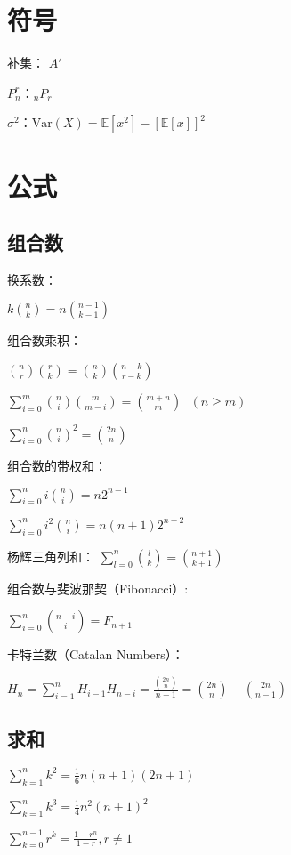 \documentclass[9pt,landscape]{article}
\begin{document}
\begin{multicols}{3}

\columnseprule=0.25pt

\section{符号}

补集： $A'$

$P_n^r$：$_nP_r$

$\sigma^2$：$\text{Var}(X)=\mathbb{E}[x^2]-\left[\mathbb{E}[x]\right]^2$

\section{公式}

\subsection{组合数}

换系数：

$k \binom{n}{k} = n \binom{n-1}{k-1}$

组合数乘积：

$\binom{n}{r}\binom{r}{k} = \binom{n}{k}\binom{n-k}{r-k}$

$\sum_{i=0}^m \binom{n}{i}\binom{m}{m-i} = \binom{m+n}{m}\ \ \ (n \geq m)$

$\sum_{i=0}^n\binom{n}{i}^2=\binom{2n}{n}$

组合数的带权和：

$ \sum_{i=0}^ni\binom{n}{i}=n2^{n-1}$

$ \sum_{i=0}^ni^2\binom{n}{i}=n(n+1)2^{n-2}$

杨辉三角列和：
$ \sum_{l=0}^n\binom{l}{k} = \binom{n+1}{k+1}$

组合数与斐波那契（Fibonacci）:

$ \sum_{i=0}^n\binom{n-i}{i}=F_{n+1}$

卡特兰数（Catalan Numbers）：

$H_n=\sum_{i=1}^nH_{i-1}H_{n-i}=\frac{\binom{2n}{n}}{n+1}=\binom{2n}{n}-\binom{2n}{n-1}$

\subsection{求和}

$\sum_{k=1}^{n}k^2=\frac{1}{6}n(n+1)(2n+1)$

$\sum_{k=1}^{n}k^3=\frac{1}{4}n^2(n+1)^2$

$\sum_{k=0}^{n-1}r^k=\frac{1-r^n}{1-r}, r\neq 1$


\end{multicols}
\end{document}
